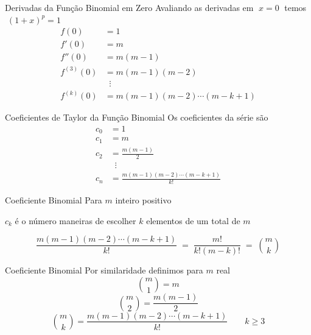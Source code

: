 \begin{frame}{Derivadas da Função Binomial em Zero}
Avaliando as derivadas em \emph{\(\;x=0\;\)} temos \(\;(1+x)^p=1\;\)
\begin{align*}
  f(0)       & = 1                        \\[2mm]
  f'(0)      & = m                        \\[2mm]
  f''(0)     & = m(m-1)                   \\[2mm]
  f^{(3)}(0) & = m(m-1)(m-2)              \\
             & \;\;\vdots                 \\
  f^{(k)}(0) & = m(m-1)(m-2)\cdots(m-k+1)
\end{align*}
\end{frame}

\begin{frame}{Coeficientes de Taylor da Função Binomial}
Os coeficientes da série são
\begin{align*}
	c_0 & = 1                        \\[2mm]
	c_1 & = m                        \\[2mm]
	c_2 & = \frac{m(m-1)}{2}         \\[2mm]
	    & \;\;\vdots                 \\
	c_n & = \frac{m(m-1)(m-2)\cdots(m-k+1)}{k!}
\end{align*}
\end{frame}

\begin{frame}{Coeficiente Binomial}
Para $m$ inteiro positivo

$c_k$ é o número maneiras de escolher $k$ elementos de um total de $m$

\vspace{\baselineskip}
\[
  \frac{m(m-1)(m-2)\cdots(m-k+1)}{k!} \;=\; \frac{m!}{k!(m-k)!} \;=\; \binom{m}{k}
\]
\end{frame}

\begin{frame}{Coeficiente Binomial}
Por similaridade definimos para $m$ real
\[
  \binom{m}{1} = m
\]
\vspace{0.5\baselineskip}
\[
  \binom{m}{2} = \frac{m(m-1)}{2}
\]
\vspace{0.5\baselineskip}
\[
  \binom{m}{k} = \frac{m(m-1)(m-2)\cdots(m-k+1)}{k!} \qquad k \geq 3
\]
\end{frame}

